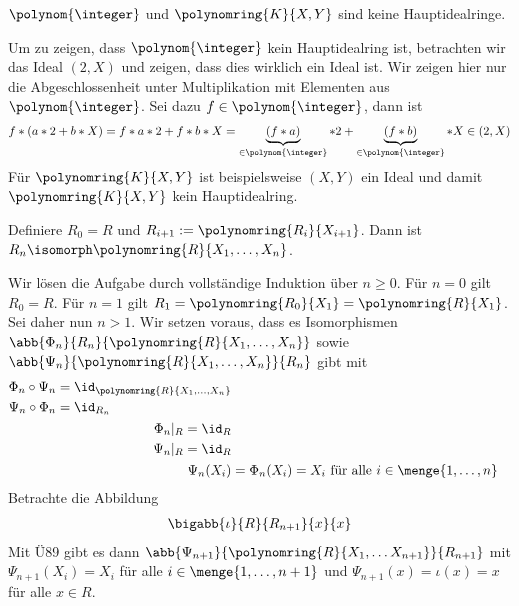 \begin{uebungsblatt}
	\begin{uebung}[Vorbereitung]
		$\polynom{\integer}$ und $\polynomring{K}{X,Y}$ sind keine Hauptidealringe.
	\end{uebung}
	\begin{loesung}
		Um zu zeigen, dass $\polynom{\integer}$ kein Hauptidealring ist, betrachten wir das Ideal $(2,X)$ und zeigen, dass dies wirklich ein Ideal ist. Wir zeigen hier nur die Abgeschlossenheit unter Multiplikation mit Elementen aus $\polynom{\integer}$. Sei dazu $f \in \polynom{\integer}$, dann ist 
		\begin{align*}
			f * (a * 2 + b * X) = f*a*2 + f*b*X = \underbrace{(f*a)}_{\in \polynom{\integer}} * 2 + \underbrace{(f*b)}_{\in \polynom{\integer}} * X \in (2,X)
		\end{align*}
		Für $\polynomring{K}{X,Y}$ ist beispielsweise $(X,Y)$ ein Ideal und damit $\polynomring{K}{X,Y}$ kein Hauptidealring.
	\end{loesung}

	
	\begin{uebung}
		Definiere $R_0 = R$ und $R_{i+1} := \polynomring{R_i}{X_{i+1}}$. Dann ist $R_n \isomorph \polynomring{R}{X_1, \dots , X_n}$.
	\end{uebung}
	\begin{loesung}
		Wir lösen die Aufgabe durch vollständige Induktion über $n \geq 0$. Für $n=0$ gilt $R_0 = R$. Für $n=1$ gilt $R_1 = \polynomring{R_0}{X_1} = \polynomring{R}{X_1}$. Sei daher nun $n > 1$. Wir setzen voraus, dass es Isomorphismen $\abb{\Phi_n}{R_n}{\polynomring{R}{X_1, \dots, X_n}}$ sowie $\abb{\Psi_n}{\polynomring{R}{X_1, \dots, X_n}}{R_n}$ gibt mit
		\begin{subequations}
			\begin{align}
			\begin{split}
			\Phi_n \circ \Psi_n &= \id_{\polynomring{R}{X_1, \dots, X_n}} \\
			\Psi_n \circ \Phi_n &= \id_{R_n}
			\end{split} \label{eq: 110_komp_psi_phi }\\
			\begin{split}
				\Phi_n |_R &= \id_R \\
				\Psi_n |_R &= \id_R 
			\end{split} \label{eq: 110_einschraenkung_psi_phi}\\
			\Psi_n(X_i) &= \Phi_n(X_i) = X_i \text{ für alle } i \in \menge{1, \dots, n} \label{eq: 110_psi_phi_gleich}
			\end{align}
		\end{subequations}
		Betrachte die Abbildung
		\begin{align}
			\bigabb{\iota}{R}{R_{n+1}}{x}{x} \label{eq: 110_def_iota}
		\end{align}
		Mit Ü89 gibt es dann $\abb{\Psi_{n+1}}{\polynomring{R}{X_1, \dots X_{n+1}}}{R_{n+1}}$ mit $\Psi_{n+1}(X_i) = X_i$ für alle $i \in \menge{1, \dots, n+1}$ und $\Psi_{n+1}(x)=\iota(x) = x$ für alle $x \in R$.
		

\end{loesung}
\end{uebungsblatt}

